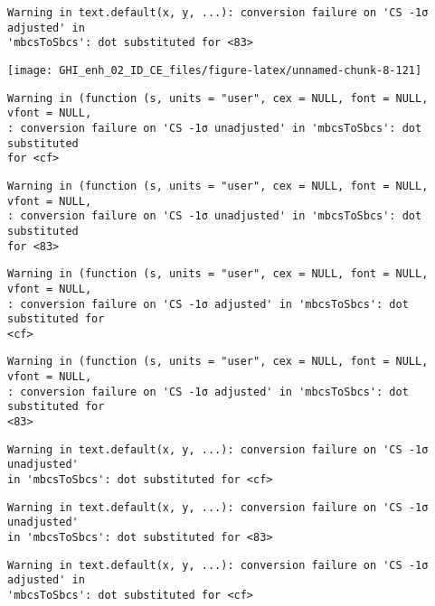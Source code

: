 \documentclass[
  10pt,
  a4paper,oneside]{article}
\begin{document}
\begin{verbatim}
Warning in text.default(x, y, ...): conversion failure on 'CS -1σ adjusted' in
'mbcsToSbcs': dot substituted for <83>
\end{verbatim}

\begin{center}\texttt{[image: GHI\_enh\_02\_ID\_CE\_files/figure-latex/unnamed-chunk-8-121]} \end{center}

\begin{verbatim}
Warning in (function (s, units = "user", cex = NULL, font = NULL, vfont = NULL,
: conversion failure on 'CS -1σ unadjusted' in 'mbcsToSbcs': dot substituted
for <cf>
\end{verbatim}

\begin{verbatim}
Warning in (function (s, units = "user", cex = NULL, font = NULL, vfont = NULL,
: conversion failure on 'CS -1σ unadjusted' in 'mbcsToSbcs': dot substituted
for <83>
\end{verbatim}

\begin{verbatim}
Warning in (function (s, units = "user", cex = NULL, font = NULL, vfont = NULL,
: conversion failure on 'CS -1σ adjusted' in 'mbcsToSbcs': dot substituted for
<cf>
\end{verbatim}

\begin{verbatim}
Warning in (function (s, units = "user", cex = NULL, font = NULL, vfont = NULL,
: conversion failure on 'CS -1σ adjusted' in 'mbcsToSbcs': dot substituted for
<83>
\end{verbatim}

\begin{verbatim}
Warning in text.default(x, y, ...): conversion failure on 'CS -1σ unadjusted'
in 'mbcsToSbcs': dot substituted for <cf>
\end{verbatim}

\begin{verbatim}
Warning in text.default(x, y, ...): conversion failure on 'CS -1σ unadjusted'
in 'mbcsToSbcs': dot substituted for <83>
\end{verbatim}

\begin{verbatim}
Warning in text.default(x, y, ...): conversion failure on 'CS -1σ adjusted' in
'mbcsToSbcs': dot substituted for <cf>
\end{verbatim}
\end{document}
